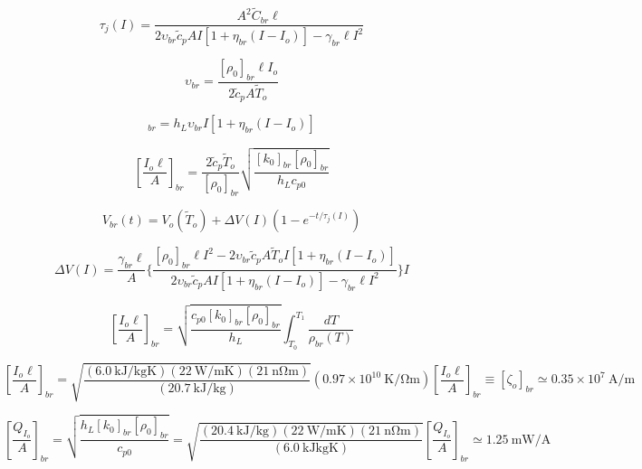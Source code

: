 \begin{equation}%
\tau_j(I)=\frac{A^2\tilde{C}_{br}\ell}{2\upsilon_{br}\tilde{c}_pAI[1+\eta_{br}(I-I_o)]-\gamma_{br}\ell I^2}
\end{equation}

\begin{equation}%
\upsilon_{br}=\frac{[\rho_0]_{br}\ell I_o}{2\tilde{c}_pA\tilde{T}_o}
\end{equation}

\begin{equation}%
[Q_I]_{br}=h_L\upsilon_{br}I[1+\eta_{br}(I-I_o)]
\end{equation}

\begin{equation}%
\left[\frac{I_o\ell}{A}\right]_{br}=\frac{2\tilde{c}_p\tilde{T}_o}{[\rho_0]_{br}}\sqrt{\frac{[k_0]_{br}[\rho_0]_{br}}{h_Lc_{p0}}}
\end{equation}

\begin{equation}%
V_{br}(t)=V_o(\tilde{T}_o)+\Delta V(I)(1-e^{-t/\tau_j(I)})
\end{equation}

\begin{equation}%
\Delta V(I)=\frac{\gamma_{br}\ell}{A}\{\frac{[\rho_0]_{br}\ell I^2-2\upsilon_{br}\tilde{c}_pA\tilde{T}_oI[1+\eta_{br}(I-I_o)]}{2\upsilon_{br}\tilde{c}_pAI[1+\eta_{br}(I-I_o)]-\gamma_{br}\ell I^2}\}I
\end{equation}

\begin{equation}
\left[\frac{I_o\ell}{A}\right]_{br}=\sqrt{\frac{c_{p0}[k_0]_{br}[\rho_0]_{br}}{h_L}}\int_{T_0}^{T_1}\frac{dT}{\rho_{br}(T)}
\end{equation}

\begin{equation}%
\left[\frac{I_o\ell}{A}\right]_{br}=\sqrt{\frac{(6.0\ \mathrm{kJ/kgK})(22\ \mathrm{W/mK})(21\ \mathrm{n\Omega m})}{(20.7\ \mathrm{kJ/kg})}}(0.97\times10^{10}\ \mathrm{K/\Omega m})
\left[\frac{I_o\ell}{A}\right]_{br}\equiv[\zeta_o]_{br}\simeq0.35\times 10^7\ \mathrm{A/m}
\end{equation}

\begin{equation}%
\left[\frac{Q_{I_o}}{A}\right]_{br}=\sqrt{\frac{h_L[k_0]_{br}[\rho_0]_{br}}{c_{p0}}}=\sqrt{\frac{(20.4\ \mathrm{kJ/kg})(22\ \mathrm{W/mK})(21\ \mathrm{n\Omega m})}{(6.0\ \mathrm{kJkgK})}}
\left[\frac{Q_{I_o}}{A}\right]_{br}\simeq1.25\ \mathrm{mW/A}
\end{equation}

